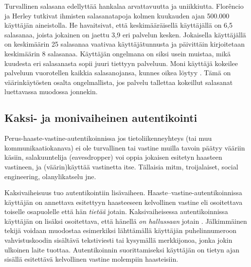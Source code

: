 \documentclass[finnish,gradu]{tktltiki}
\begin{document}


  Turvallinen salasana edellyttää hankalaa arvattavuutta ja uniikkiutta. Florêncio ja Herley \cite{study_of_passwords_07} tutkivat ihmisten salasanatapoja kolmen kuukauden ajan 500.000 käyttäjän aineistolla. He havaitsivat, että keskimääräisellä käyttäjällä on 6,5 salasanaa, joista jokainen on jaettu 3,9 eri palvelun kesken. Jokaisella käyttäjällä on keskimäärin 25 salasanaa vaativaa käyttäjätunnusta ja päivittäin kirjoitetaan keskimäärin 8 salasanaa. Käyttäjän ongelmana on siksi usein muistaa, mikä kuudesta eri salasanasta sopii juuri tiettyyn palveluun. Moni käyttäjä kokeilee palveluun vuorotellen kaikkia salasanojansa, kunnes oikea löytyy \cite{study_of_passwords_07}. Tämä on väärinkäytösten osalta ongelmallista, jos palvelu tallettaa kokeillut salasanat luettavassa muodossa jonnekin.


  \subsection{Kaksi- ja monivaiheinen autentikointi} %
  \label{sub:kaksivaiheinen_autentikointi}

  Perus-haaste-vastine-autentikoinnissa jos tietoliikenneyhteys (tai muu kommunikaatiokanava) ei ole turvallinen tai vastine muilla tavoin päätyy vääriin käsiin, salakuuntelija (eavesdropper) voi oppia jokaisen esitetyn haasteen vastineen, ja (väärin)käyttää vastinetta itse.
  Tällaisia mitm, troijalaiset, social engineering, olanylikatselu jne.

  Kaksivaiheisuus tuo autentikointiin lisävaiheen. Haaste--vastine-autentikoinnissa käyttäjän on annettava esitettyyn haasteeseen kelvollinen vastine eli osoitettava toiselle osapuolelle että hän \emph{tietää} jotain. Kaksivaiheisessa autentikoinnissa käyttäjän on lisäksi osoitettava, että hänellä \emph{on hallussaan} jotain \cite{NIST_SP800-63-1, google_2step_2010}. Jälkimmäinen tekijä voidaan muodostaa esimerkiksi lähttämällä käyttäjän puhelinnumeroon vahvistuskoodin sisältävä tekstiviesti tai kysymällä merkkijonoa, jonka jokin ulkoinen laite tuottaa. Autentikoinnin suorittamiseksi käyttäjän on tietyn ajan sisällä esitettävä kelvollinen vastine molempiin haasteisiin.
\end{document}
